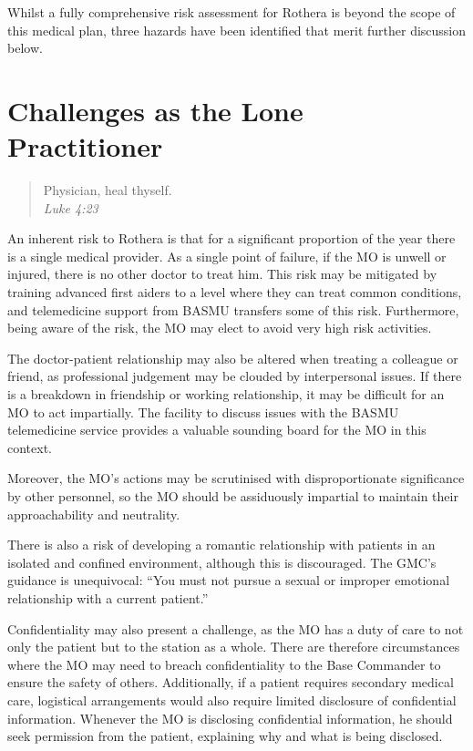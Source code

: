 \documentclass[12pt,a4paper]{article}
\begin{document}
Whilst a fully comprehensive risk assessment for Rothera is beyond the scope of this medical plan, three hazards have been identified that merit further discussion below.

\section{Challenges as the Lone Practitioner}

\begin{quote}
Physician, heal thyself. \\
\em Luke 4:23
\end{quote}

An inherent risk to Rothera is that for a significant proportion of the year there is a single medical provider. As a single point of failure, if the MO is unwell or injured, there is no other doctor to treat him. This risk may be mitigated by training advanced first aiders to a level where they can treat common conditions, and telemedicine support from BASMU transfers some of this risk. Furthermore, being aware of the risk, the MO may elect to avoid very high risk activities.

The doctor-patient relationship may also be altered when treating a colleague or friend, as professional judgement may be clouded by interpersonal issues. If there is a breakdown in friendship or working relationship, it may be difficult for an MO to act impartially. The facility to discuss issues with the BASMU telemedicine service provides a valuable sounding board for the MO in this context.

Moreover, the MO's actions may be scrutinised with disproportionate significance by other personnel, so the MO should be assiduously impartial to maintain their approachability and neutrality.

There is also a risk of developing a romantic relationship with patients in an isolated and confined environment, although this is discouraged. The GMC's guidance is unequivocal: ``You must not pursue a sexual or improper emotional relationship with a current patient.''\cite{Anonymous:2013wj,Anonymous:2013ve}

Confidentiality may also present a challenge, as the MO has a duty of care to not only the patient but to the station as a whole. There are therefore circumstances where the MO may need to breach confidentiality to the Base Commander to ensure the safety of others. Additionally, if a patient requires secondary medical care, logistical arrangements would also require limited disclosure of confidential information. Whenever the MO is disclosing confidential information, he should seek permission from the patient, explaining why and what is being disclosed.\cite{Anonymous:2013ta}
\end{document}
